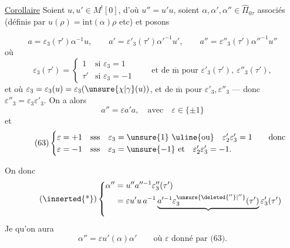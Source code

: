 \uline{Corollaire} Soient $u,u'\in M^![0]$, d'où $u''=u'u$, soient $\alpha,\alpha',\alpha''\in\widehat\Pi_{0\tau}$ associés (définis par $u(\rho)=\mathrm{int}(\alpha)\rho$ etc) et posons



\[
\tag{61}
a=\varepsilon_3(\tau')\alpha^{-1}u,\qquad
a'=\varepsilon'_3(\tau')\alpha'^{-1}u',\qquad
a''=\varepsilon''_3(\tau')\alpha''^{-1}u''
\]
où
\[
\varepsilon_3(\tau')=
\begin{cases}
1&\text{si }\varepsilon_3=1\\
\tau'&\text{si }\varepsilon_3=-1
\end{cases}
\qquad
\text{et de }\overline{\mathrm m}\text{ pour }\varepsilon'_3(\tau'),\ \varepsilon''_3(\tau'),
\]
et où $\varepsilon_3=\varepsilon_3(u)=\varepsilon_3(\unsure{\chi|\gamma}(u))$,
et de $\overline{\mathrm m}$ pour $\varepsilon'_3,\varepsilon''_3$
--- donc $\varepsilon''_3=\varepsilon_3\varepsilon'_3$. On a alors
\[
\tag{62}
a''=\varepsilon a'a,\quad\text{avec}\quad\varepsilon\in\{\pm1\}
\]
et
\[
\tag{63}
\begin{cases}
\varepsilon=+1&\text{sss}\quad \varepsilon_3=\unsure{1}\ \text{\uline{ou}}\quad
\varepsilon'_2\varepsilon'_3=1\qquad\text{donc}\\
\varepsilon=-1&\text{sss}\quad \varepsilon_3=\unsure{-1}\ \text{et}\quad
\varepsilon'_2\varepsilon'_3=-1.
\end{cases}
\]

On  donc
\[
\tag{\inserted{*}}
\left\{
\begin{aligned}
\alpha''&=u''a''^{-1}\varepsilon''_3(\tau')\\
&=\varepsilon u'u\,a^{-1}\underbrace{a'^{-1}\varepsilon_3^{\unsure{\deleted{''}|''}}(\tau')}_{\vphantom{A}}\varepsilon'_3(\tau')
\end{aligned}
\right.
\]
Je 
 qu'on aura
\[
\tag{64}
\alpha''=\varepsilon u'(\alpha)\alpha'
\qquad\text{où }\varepsilon\text{ donné par (63).}
\]

